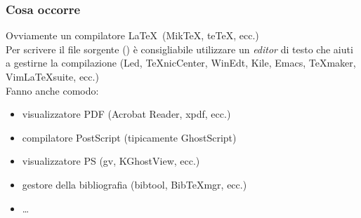 \documentclass[svgnames,%
	ucs,%
	pdftex]{guitbeamer}
\begin{document}
\begin{frame}
  \frametitle{Cosa occorre}
	Ovviamente un compilatore \LaTeX\ (\alert{Mik\TeX}, \alert{te\TeX}, ecc.)\\
  \medskip
	Per scrivere il file sorgente () \`e consigliabile
	utilizzare un \emph{editor}\/ di testo che aiuti a gestirne la
	compilazione (\alert{Led}, \alert{\TeX nicCenter}, \alert{WinEdt}, \alert{Kile},
	\alert{Emacs}, \alert{\TeX maker}, \alert{Vim\LaTeX suite}, ecc.)\\
  \medskip
	Fanno anche comodo:
	\begin{itemize}
		\item visualizzatore PDF (\alert{Acrobat Reader}, \alert{xpdf}, ecc.)
		\item compilatore PostScript (tipicamente \alert{GhostScript})
		\item visualizzatore PS (\alert{gv}, \alert{KGhostView}, ecc.)	
		\item gestore della bibliografia (\alert{bibtool}, \alert{BibTeXmgr}, ecc.)
		\item \dots
	\end{itemize}
\end{frame}
\end{document}
